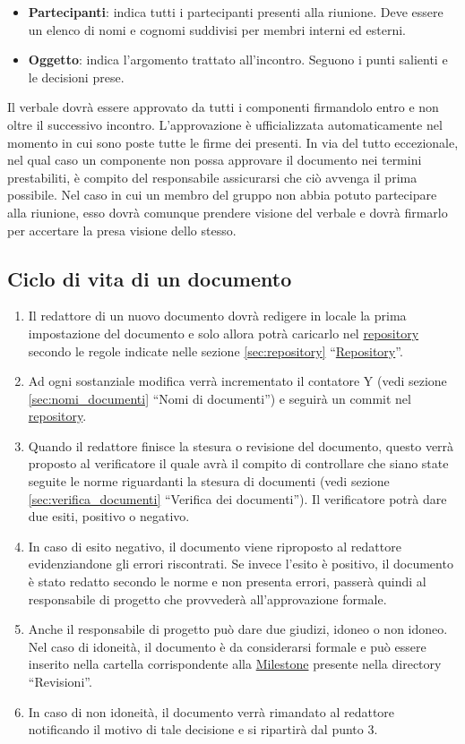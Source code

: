 \begin{itemize}
\begin{itemize}
\item \textbf{Partecipanti}: indica tutti i partecipanti presenti alla riunione. Deve essere un elenco di nomi e cognomi suddivisi per membri interni ed esterni.
\item \textbf{Oggetto}: indica l'argomento trattato all'incontro. Seguono i punti salienti e le decisioni prese.
\end{itemize}
Il verbale dovrà essere approvato da tutti i componenti firmandolo entro e non oltre il successivo incontro. L'approvazione è ufficializzata automaticamente nel momento in cui sono poste tutte le firme dei presenti. In via del tutto eccezionale, nel qual caso un componente non possa approvare il documento nei termini prestabiliti, è compito del responsabile assicurarsi che ciò avvenga il prima possibile. Nel caso in cui un membro del gruppo non abbia potuto partecipare alla riunione, esso dovrà comunque prendere visione del verbale e dovrà firmarlo per accertare la presa visione dello stesso.
\end{itemize}

\subsection{Ciclo di vita di un documento}
\begin{enumerate}
\item Il redattore di un nuovo documento dovrà redigere in locale la prima impostazione del documento e solo allora potrà caricarlo nel \underline{repository} secondo le regole indicate nelle sezione \ref{sec:repository} ``\underline{Repository}''.
\item Ad ogni sostanziale modifica verrà incrementato il contatore Y (vedi sezione \ref{sec:nomi_documenti} ``Nomi di documenti'') e seguirà un commit nel \underline{repository}.
\item Quando il redattore finisce la stesura o revisione del documento, questo verrà proposto al verificatore il quale avrà il compito di controllare che siano state seguite le norme riguardanti la stesura di documenti (vedi sezione \ref{sec:verifica_documenti} ``Verifica dei documenti''). Il verificatore potrà dare due esiti, positivo o negativo.
\item
In caso di esito negativo, il documento viene riproposto al redattore evidenziandone gli errori riscontrati. Se invece l'esito è positivo, il documento è stato redatto secondo le norme e non presenta errori, passerà quindi al responsabile di progetto che provvederà all'approvazione formale.
\item Anche il responsabile di progetto può dare due giudizi, idoneo o non idoneo. Nel caso di idoneità, il documento è da considerarsi formale e può essere inserito nella cartella corrispondente alla \underline{Milestone} presente nella directory ``Revisioni''.
\item In caso di non idoneità, il documento verrà rimandato al redattore notificando il motivo di tale decisione e si ripartirà dal punto 3.
\end{enumerate}

